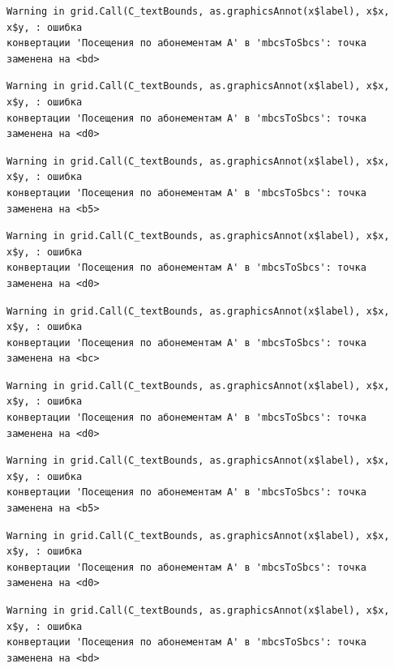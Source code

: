 \documentclass[
  letterpaper,
  DIV=11,
  numbers=noendperiod]{scrreprt}
\begin{document}
\begin{verbatim}
Warning in grid.Call(C_textBounds, as.graphicsAnnot(x$label), x$x, x$y, : ошибка
конвертации 'Посещения по абонементам А' в 'mbcsToSbcs': точка заменена на <bd>
\end{verbatim}

\begin{verbatim}
Warning in grid.Call(C_textBounds, as.graphicsAnnot(x$label), x$x, x$y, : ошибка
конвертации 'Посещения по абонементам А' в 'mbcsToSbcs': точка заменена на <d0>
\end{verbatim}

\begin{verbatim}
Warning in grid.Call(C_textBounds, as.graphicsAnnot(x$label), x$x, x$y, : ошибка
конвертации 'Посещения по абонементам А' в 'mbcsToSbcs': точка заменена на <b5>
\end{verbatim}

\begin{verbatim}
Warning in grid.Call(C_textBounds, as.graphicsAnnot(x$label), x$x, x$y, : ошибка
конвертации 'Посещения по абонементам А' в 'mbcsToSbcs': точка заменена на <d0>
\end{verbatim}

\begin{verbatim}
Warning in grid.Call(C_textBounds, as.graphicsAnnot(x$label), x$x, x$y, : ошибка
конвертации 'Посещения по абонементам А' в 'mbcsToSbcs': точка заменена на <bc>
\end{verbatim}

\begin{verbatim}
Warning in grid.Call(C_textBounds, as.graphicsAnnot(x$label), x$x, x$y, : ошибка
конвертации 'Посещения по абонементам А' в 'mbcsToSbcs': точка заменена на <d0>
\end{verbatim}

\begin{verbatim}
Warning in grid.Call(C_textBounds, as.graphicsAnnot(x$label), x$x, x$y, : ошибка
конвертации 'Посещения по абонементам А' в 'mbcsToSbcs': точка заменена на <b5>
\end{verbatim}

\begin{verbatim}
Warning in grid.Call(C_textBounds, as.graphicsAnnot(x$label), x$x, x$y, : ошибка
конвертации 'Посещения по абонементам А' в 'mbcsToSbcs': точка заменена на <d0>
\end{verbatim}

\begin{verbatim}
Warning in grid.Call(C_textBounds, as.graphicsAnnot(x$label), x$x, x$y, : ошибка
конвертации 'Посещения по абонементам А' в 'mbcsToSbcs': точка заменена на <bd>
\end{verbatim}
\end{document}
